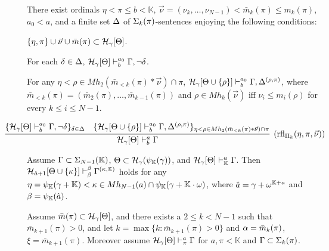 \documentclass{article}
\newcommand{\mK}{\mathbb{K}}
\begin{document}
There exist ordinals 
$\eta<\pi\leq b<\mK$,
$\vec{\nu}=(\nu_{k},\ldots,\nu_{N-1})< \bar{m}_{k}(\pi)\leq m_{k}(\pi)$, 
$a_{0}<a$,
and a finite set $\Delta$ of $\Sigma_{k}(\pi)$-sentences enjoying the following conditions:



\benu

\item
$\{\eta,\pi\}\cup\vec{\nu}\cup\bar{m}(\pi)\subset{\cal H}_{\gamma}[\Theta]$.


 \item
For each $\delta\in\Delta$,
$
\mathcal{H}_{\gamma}[\Theta]\vdash^{a_{0}}_{b}\Gamma, \lnot\delta
$.

\item
For any $\eta<\rho\in Mh_{2}(\bar{m}_{<k}(\pi)*\vec{\nu})\cap \pi$,
$\mathcal{H}_{\gamma}[\Theta\cup \{\rho\}]\vdash^{a_{0}}_{b}\Gamma, 
\Delta^{(\rho,\pi)}$, where
$\bar{m}_{<k}(\pi)=(\bar{m}_{2}(\pi),\ldots,\bar{m}_{k-1}(\pi))$ and
$\rho\in Mh_{k}(\vec{\nu})$ iff $\nu_{i}\leq m_{i}(\rho)$ for every $k\leq i\leq N-1$.

\eenu

\[
\hspace{-10mm}
\infer[({\rm rfl}_{\Pi_{k}}(\eta,\pi,\vec{\nu}))]{
\calh_{\gam}[\Tht]\vdash^{a}_{b}\Gam}
{
\{
\mathcal{H}_{\gam}[\Tht]\vdash^{a_{0}}_{b}\Gamma, \lnot\del
\}_{\del\in\Del}
&
\{
\mathcal{H}_{\gam}[\Tht\cup \{\rho\}]\vdash^{a_{0}}_{b}\Gamma, 
\Del^{(\rho,\pi)}\}_{\eta<\rho\in Mh_{2}(\bar{m}_{<k}(\pi)*\vec{\nu})\cap \pi}
}
\]

\edes



\blem\label{lem:lowerPiN}
Assume $\Gam\subset\Sig_{N-1}(\mK)$, $\Tht\subset\calh_{\gam}(\psi_{\mK}(\gam))$,
and
$\calh_{\gam}[\Tht]\vdash^{a}_{\mK}\Gam$.
Then 
$\calh_{\hat{a}+1}[\Tht\cup \{\kap\}]\vdash^{\bet}_{\bet}\Gam^{(\kap,\mK)}$ holds for any 
$\eta=\psi_{\mK}(\gam+\mK)<\kap\in Mh_{N-1}(a)\cap \psi_{\mK}(\gam+\mK\cdot\ome)$,
where $\hat{a}=\gam+\ome^{\mK+a}$ and $\bet=\psi_{\mK}(\hat{a})$.
\elem



\blem\label{lem:lowerPiN3}
Assume $\bar{m}(\pi)\subset{\cal H}_{\gamma}[\Theta]$, and
there exists a $2\leq k<N-1$ such that
$\bar{m}_{k+1}(\pi)>0$, and let
$k=\max\{k: \bar{m}_{k+1}(\pi)>0\}$ and
$\alpha=\bar{m}_{k}(\pi)$, $\xi=\bar{m}_{k+1}(\pi)$.
Moreover assume ${\cal H}_{\gamma}[\Theta]\vdash^{a}_{\pi}\Gamma$ for $a,\pi<\mK$
and $\Gamma\subset\Sigma_{k}(\pi)$.
\end{document}
